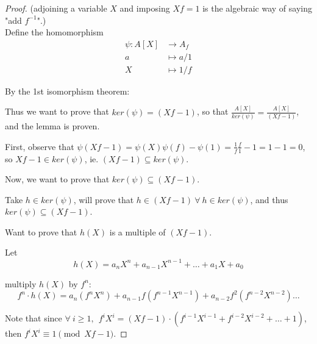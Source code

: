 \documentclass{article}
\theoremstyle{definition}
\begin{document}
\begin{proof}
  (adjoining a variable $X$ and imposing $Xf=1$ is the algebraic way of saying "add $f^{-1}$".)\\
  Define the homomorphism
  \begin{align*}
    \psi: A[X] &\longrightarrow A_f\\
    a &\longmapsto a/1\\
    X &\longmapsto 1/f
  \end{align*}

By the 1st isomorphism theorem:


  Thus we want to prove that $ker(\psi) = (Xf-1)$, so that $\frac{A[X]}{ker(\psi)} = \frac{A[X]}{(Xf-1)}$, and the lemma is proven.

  \vspace{0.3cm}
  First, observe that $\psi(Xf-1) = \psi(X)\psi(f)-\psi(1) = \frac{1}{f} \frac{f}{1} - 1 = 1-1=0$,
  so $Xf-1 \in ker(\psi)$, ie. $(Xf-1) \subseteq ker(\psi)$.

  Now, we want to prove that $ker(\psi) \subseteq (Xf-1)$.

  Take $h \in ker(\psi)$, will prove that $h \in (Xf-1)~ \forall~ h \in ker(\psi)$, and thus $ker(\psi) \subseteq(Xf-1)$.

  \vspace{0.3cm}
  Want to prove that $h(X)$ is a multiple of $(Xf-1)$.

  Let
  $$h(X)=a_n X^n + a_{n-1} X^{n-1} + \ldots + a_1 X + a_0$$


  multiply $h(X)$ by $f^n$:
  $$f^n \cdot h(X)=a_n (f^n X^n) + a_{n-1} f (f^{n-1} X^{n-1}) + a_{n-2} f^2 (f^{n-2} X^{n-2})  \ldots$$

  Note that since $\forall~ i \geq 1,~~ f^i X^i = (Xf -1)\cdot (f^{i-1} X^{i-1} + f^{i-2} X^{i-2} + \ldots + 1)$, then $f^i X^i \equiv 1 \pmod{Xf-1}$.


\end{proof}
\end{document}
